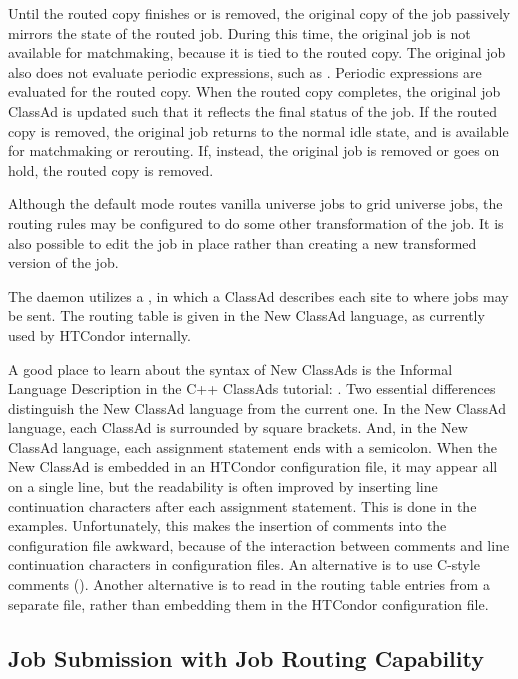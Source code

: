 Until the routed copy finishes or is removed,
the original copy of the job passively mirrors the state of the routed job.
During this time,
the original job is not available for matchmaking,
because it is tied to the routed copy.
The original job also does not evaluate periodic expressions,
such as .
Periodic expressions are evaluated for the routed copy.
When the routed copy completes,
the original job ClassAd is updated such that it reflects the
final status of the job.
If the routed copy is removed,
the original job returns to the normal idle state,
and is available for matchmaking or rerouting.
If, instead, the original job is removed or goes on hold,
the routed copy is removed.

Although the default mode routes vanilla universe jobs to
grid universe jobs, the routing rules may be configured
to do some other transformation of the job.  It is also
possible to edit the job in place rather than creating
a new transformed version of the job.

The  daemon utilizes a ,
in which a ClassAd describes each site to where jobs may be sent.
The routing table is given in the New ClassAd language,
as currently used by HTCondor internally.

A good place to learn about the syntax of New ClassAds
is the Informal Language Description in the C++ ClassAds
tutorial: .
Two essential differences distinguish the New ClassAd language
from the current one.
In the New ClassAd language,
each ClassAd is surrounded by square brackets.
And, in the New ClassAd language,
each assignment statement ends with a semicolon.
When the New
ClassAd is embedded in an HTCondor configuration file,
it may appear all on a single line,
but the readability is often improved by inserting line continuation
characters
after each assignment statement.
This is done in the examples.
Unfortunately, this makes the insertion of comments into
the configuration file awkward,
because of the interaction between comments and line continuation
characters in configuration files.
An alternative is to use C-style comments (\Code{/* \Dots */}).
Another alternative is to read in the routing table entries
from a separate file,
rather than embedding them in the HTCondor configuration file.

\subsection{\label{sec:RouterJobSubmission}Job Submission with Job Routing Capability}

